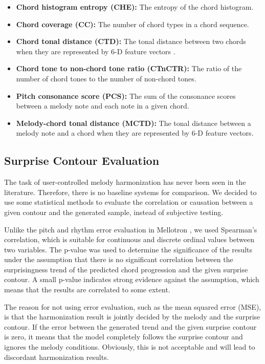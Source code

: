 \documentclass{article}
\begin{document}
\begin{itemize}[leftmargin=*]
\setlength\itemsep{-0.3em}
\item {\bf{Chord histogram entropy (CHE):}} 
The entropy of the chord histogram.

\item {\bf{Chord coverage (CC):}}
The number of chord types in a chord sequence.

\item {\bf{Chord tonal distance (CTD):}}
The tonal distance between two chords when they are represented by 6-D feature vectors \cite{Harte2006}.

\item {\bf{Chord tone to non-chord tone ratio (CTnCTR):}}
The ratio of the number of chord tones to the number of non-chord tones.

\item {\bf{Pitch consonance score (PCS):}}
The sum of the consonance scores between a melody note and each note in a given chord. 

\item {\bf{Melody-chord tonal distance (MCTD):}}
The tonal distance between a melody note and a chord when they are represented by 6-D feature vectors.

\end{itemize}

\subsection{Surprise Contour Evaluation}

The task of user-controlled melody harmonization has never been seen in the literature. Therefore, there is no baseline systems for comparison. We decided to use some statistical methods to evaluate the correlation or causation between a given contour and the generated sample, instead of subjective testing.

Unlike the pitch and rhythm error evaluation in Mellotron \cite{Valle2020}, we used Spearman's correlation, which is suitable for continuous and discrete ordinal values between two variables. The p-value was used to determine the significance of the results under the assumption that there is no significant correlation between the surprisingness trend of the predicted chord progression and the given surprise contour. A small p-value indicates strong evidence against the assumption, which means that the results are correlated to some extent. 

The reason for not using error evaluation, such as the mean squared error (MSE), is that the harmonization result is jointly decided by the melody and the surprise contour. If the error between the generated trend and the given surprise contour is zero, it means that the model completely follows the surprise contour and ignores the melody conditions. Obviously, this is not acceptable and will lead to discordant harmonization results.
\end{document}
